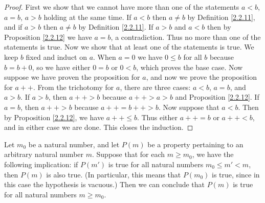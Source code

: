 \begin{proof}
First we show that we cannot have more than one of the statements \(a < b\), \(a = b\), \(a > b\) holding at the same time.
If \(a < b\) then \(a \neq b\) by Definition \ref{2.2.11}, and if \(a > b\) then \(a \neq b\) by Definition \ref{2.2.11}.
If \(a > b\) and \(a < b\) then by Proposition \ref{2.2.12} we have \(a = b\), a contradiction.
Thus no more than one of the statements is true.
Now we show that at least one of the statements is true.
We keep \(b\) fixed and induct on \(a\).
When \(a = 0\) we have \(0 \leq b\) for all \(b\) because \(b = b + 0\), so we have either \(0 = b\) or \(0 < b\), which proves the base case.
Now suppose we have proven the proposition for \(a\), and now we prove the proposition for \(a++\).
From the trichotomy for \(a\), there are three cases: \(a < b\), \(a = b\), and \(a > b\).
If \(a > b\), then \(a++ > b\) because \(a++ > a > b\) and Proposition \ref{2.2.12}.
If \(a = b\), then \(a++ > b\) because \(a++ = b++ > b\).
Now suppose that \(a < b\).
Then by Proposition \ref{2.2.12}, we have \(a++ \leq b\).
Thus either \(a++ = b\) or \(a++ < b\), and in either case we are done.
This closes the induction.
\end{proof}

\begin{proposition}\label{2.2.14}
Let \(m_0\) be a natural number, and let \(P(m)\) be a property pertaining to an arbitrary natural number \(m\).
Suppose that for each \(m \geq m_0\), we have the following implication: if \(P(m')\) is true for all natural numbers \(m_0 \leq m' < m\), then \(P(m)\) is also true.
(In particular, this means that \(P(m_0)\) is true, since in this case the hypothesis is vacuous.)
Then we can conclude that \(P(m)\) is true for all natural numbers \(m \geq m_0\).
\end{proposition}

